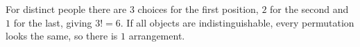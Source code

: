 For distinct people there are $3$ choices for the first position, $2$ for the second and $1$ for the last, giving $3!=\boxed6$. If all objects are indistinguishable, every permutation looks the same, so there is $\boxed1$ arrangement.
